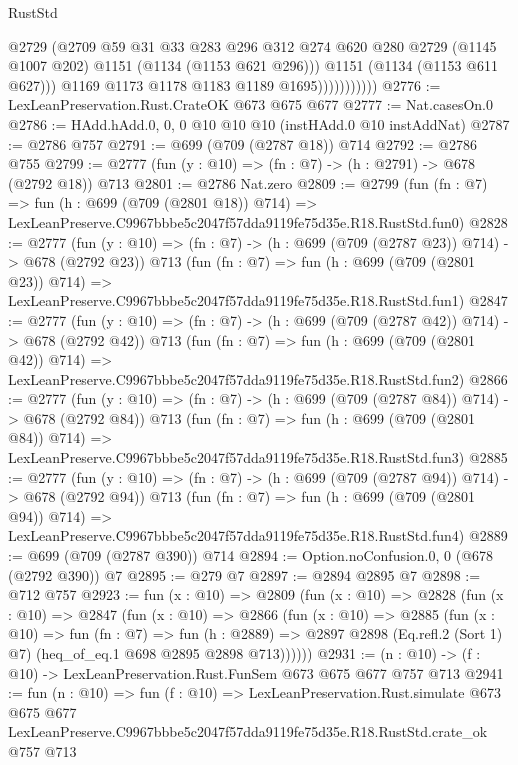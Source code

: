 \begin{lexlean}{RustStd}
\begin{coremodule}
                            @2729
                            (@2709
                              @59
                              @31
                              @33
                              @283
                              @296
                              @312
                              @274
                              @620
                              @280
                              @2729
                              (@1145 @1007 @202)
                              @1151
                              (@1134 (@1153 @621 @296)))
                            @1151
                            (@1134 (@1153 @611 @627)))
                          @1169
                          @1173
                          @1178
                          @1183
                          @1189
                          @1695)))))))))))
@2776 := LexLeanPreservation.Rust.CrateOK @673 @675 @677
@2777 := Nat.casesOn.{0}
@2786 := HAdd.hAdd.{0, 0, 0} @10 @10 @10 (instHAdd.{0} @10 instAddNat)
@2787 := @2786 @757
@2791 := @699 (@709 (@2787 @18)) @714
@2792 := @2786 @755
@2799 := @2777 (fun (y : @10) => (fn : @7) -> (h : @2791) -> @678 (@2792 @18)) @713
@2801 := @2786 Nat.zero
@2809 := @2799
    (fun (fn : @7) =>
    fun (h : @699 (@709 (@2801 @18)) @714) =>
    LexLeanPreserve.C9967bbbe5c2047f57dda9119fe75d35e.R18.RustStd.fun0)
@2828 := @2777
    (fun (y : @10) => (fn : @7) -> (h : @699 (@709 (@2787 @23)) @714) -> @678 (@2792 @23))
    @713
    (fun (fn : @7) =>
    fun (h : @699 (@709 (@2801 @23)) @714) =>
    LexLeanPreserve.C9967bbbe5c2047f57dda9119fe75d35e.R18.RustStd.fun1)
@2847 := @2777
    (fun (y : @10) => (fn : @7) -> (h : @699 (@709 (@2787 @42)) @714) -> @678 (@2792 @42))
    @713
    (fun (fn : @7) =>
    fun (h : @699 (@709 (@2801 @42)) @714) =>
    LexLeanPreserve.C9967bbbe5c2047f57dda9119fe75d35e.R18.RustStd.fun2)
@2866 := @2777
    (fun (y : @10) => (fn : @7) -> (h : @699 (@709 (@2787 @84)) @714) -> @678 (@2792 @84))
    @713
    (fun (fn : @7) =>
    fun (h : @699 (@709 (@2801 @84)) @714) =>
    LexLeanPreserve.C9967bbbe5c2047f57dda9119fe75d35e.R18.RustStd.fun3)
@2885 := @2777
    (fun (y : @10) => (fn : @7) -> (h : @699 (@709 (@2787 @94)) @714) -> @678 (@2792 @94))
    @713
    (fun (fn : @7) =>
    fun (h : @699 (@709 (@2801 @94)) @714) =>
    LexLeanPreserve.C9967bbbe5c2047f57dda9119fe75d35e.R18.RustStd.fun4)
@2889 := @699 (@709 (@2787 @390)) @714
@2894 := Option.noConfusion.{0, 0} (@678 (@2792 @390)) @7
@2895 := @279 @7
@2897 := @2894 @2895 @7
@2898 := @712 @757
@2923 := fun (x : @10) =>
  @2809
    (fun (x : @10) =>
    @2828
      (fun (x : @10) =>
      @2847
        (fun (x : @10) =>
        @2866
          (fun (x : @10) =>
          @2885
            (fun (x : @10) =>
            fun (fn : @7) =>
            fun (h : @2889) =>
            @2897 @2898 (Eq.refl.{2} (Sort 1) @7) (heq_of_eq.{1} @698 @2895 @2898 @713))))))
@2931 := (n : @10) -> (f : @10) -> LexLeanPreservation.Rust.FunSem @673 @675 @677 @757 @713
@2941 := fun (n : @10) =>
  fun (f : @10) =>
  LexLeanPreservation.Rust.simulate
    @673
    @675
    @677
    LexLeanPreserve.C9967bbbe5c2047f57dda9119fe75d35e.R18.RustStd.crate_ok
    @757
    @713
\end{coremodule}
\end{lexlean}

